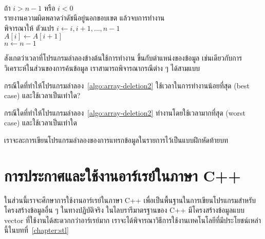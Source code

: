 \begin{algt}
\label{algo:array-deletion2}
\\
\hspace*{0.2in} ถ้า $i > n-1$ หรือ $i < 0$\\
\hspace*{0.2in}\hspace*{0.2in} รายงาน{\wbr}ความผิด{\wbr}พลาด{\wbr}ว่า{\wbr}ดัชนี{\wbr}อยู่{\wbr}นอก{\wbr}ขอบเขต แล้ว{\wbr}จบ{\wbr}การ{\wbr}ทำงาน\\
\hspace*{0.2in} พิจารณา{\wbr}ให้ ตัวแปร $i\leftarrow i,i+1,\ldots,n-1$\\
\hspace*{0.2in}\hspace*{0.2in} $A[i]\leftarrow A[i+1]$\\
\hspace*{0.2in} $n\leftarrow n-1$
\end{algt}

สังเกต{\wbr}ว่า{\wbr}เวลา{\wbr}ที่{\wbr}โปรแกรม{\wbr}ลำ{\wbr}ลอง{\wbr}ข้างต้น{\wbr}ใช้{\wbr}การ{\wbr}ทำงาน ขึ้น{\wbr}กับ{\wbr}ตำแหน่ง{\wbr}ของ{\wbr}ข้อมูล{\wbr}
เช่นเดียวกับ{\wbr}การ{\wbr}วิเคราะห์{\wbr}ใน{\wbr}ส่วน{\wbr}ของ{\wbr}การ{\wbr}ค้น{\wbr}ข้อมูล เรา{\wbr}สามารถ{\wbr}พิจารณา{\wbr}กรณี{\wbr}ต่าง ๆ ได้{\wbr}สาม{\wbr}แบบ{\wbr}

\begin{quiz}{}
กรณี{\wbr}ใด{\wbr}ที่{\wbr}ทำ{\wbr}ให้{\wbr}โปรแกรม{\wbr}ลำ{\wbr}ลอง~\ref{algo:array-deletion2}
ใช้เวลา{\wbr}ใน{\wbr}การ{\wbr}ทำงาน{\wbr}น้อย{\wbr}ที่สุด (best case) และ{\wbr}ใช้เวลา{\wbr}เป็น{\wbr}เท่าใด?
\end{quiz}

\begin{quiz}{}
กรณี{\wbr}ใด{\wbr}ที่{\wbr}ทำ{\wbr}ให้{\wbr}โปรแกรม{\wbr}ลำ{\wbr}ลอง~\ref{algo:array-deletion2} ทำงาน{\wbr}โดย{\wbr}ใช้เวลา{\wbr}มาก{\wbr}ที่สุด (worst case)  และ{\wbr}ใช้เวลา{\wbr}เป็น{\wbr}เท่าใด{\wbr}
\end{quiz}

เรา{\wbr}จะ{\wbr}ละ{\wbr}การ{\wbr}เขียน{\wbr}โปรแกรม{\wbr}ลำ{\wbr}ลองของ{\wbr}การ{\wbr}แทรก{\wbr}ข้อมูล{\wbr}ใน{\wbr}รายการ{\wbr}ไว้{\wbr}เป็น{\wbr}แบบฝึกหัด{\wbr}ท้าย{\wbr}บท{\wbr}

\section{การ{\wbr}ประกาศ{\wbr}และ{\wbr}ใช้{\wbr}งาน{\wbr}อาร์เรย์{\wbr}ใน{\wbr}ภาษา C++}
ใน{\wbr}ส่วน{\wbr}นี้{\wbr}เรา{\wbr}จะ{\wbr}ศึกษา{\wbr}การ{\wbr}ใช้{\wbr}งาน{\wbr}อาร์เรย์{\wbr}ใน{\wbr}ภาษา C++ เพื่อ{\wbr}เป็น{\wbr}พื้นฐาน{\wbr}ใน{\wbr}การ{\wbr}เขียน{\wbr}โปรแกรม{\wbr}สำหรับ{\wbr}โครงสร้าง{\wbr}ข้อมูล{\wbr}อื่น ๆ 
ใน{\wbr}ทาง{\wbr}ปฏิบัติ{\wbr}จริง ใน{\wbr}ไลบ{\wbr}รา{\wbr}รี{\wbr}มาตรฐาน{\wbr}ของ C++ มี{\wbr}โครงสร้าง{\wbr}ข้อมูล{\wbr}แบบ {\ct vector}
ที่{\wbr}ใช้{\wbr}งาน{\wbr}ได้{\wbr}สะดวก{\wbr}กว่า{\wbr}อาร์เรย์{\wbr}มาก{\wbr}
เรา{\wbr}จะ{\wbr}ได้{\wbr}พิจารณา{\wbr}วิธีการ{\wbr}ใช้{\wbr}งาน{\wbr}เทคโนโลยี{\wbr}ที่{\wbr}มี{\wbr}ประโยชน์{\wbr}เหล่านี้{\wbr}ใน{\wbr}บท{\wbr}ที่~\ref{chapter:stl}

